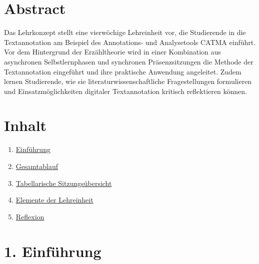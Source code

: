 \documentclass[
          a4paper,
        ]{article}
\providecommand{\tightlist}{%
  \setlength{\itemsep}{0pt}\setlength{\parskip}{0pt}}
\begin{document}
\pagestyle{plain}


\maketitle
















\pagestyle{page}

\renewcommand{\arraystretch}{3}  %

\section{Abstract}\label{abstract}

Das Lehrkonzept stellt eine vierwöchige Lehreinheit vor, die Studierende
in die Textannotation am Beispiel des Annotations- und Analysetools
CATMA einführt. Vor dem Hintergrund der Erzähltheorie wird in einer
Kombination aus asynchronen Selbstlernphasen und synchronen
Präsenzsitzungen die Methode der Textannotation eingeführt und ihre
praktische Anwendung angeleitet. Zudem lernen Studierende, wie sie
literaturwissenschaftliche Fragestellungen formulieren und
Einsatzmöglichkeiten digitaler Textannotation kritisch reflektieren
können.

\section{Inhalt}\label{inhalt}

\begin{enumerate}
\def\labelenumi{\arabic{enumi}.}
\tightlist
\item
  \hyperref[einfuxfchrung]{Einführung}
\item
  \hyperref[gesamtablauf]{Gesamtablauf}
\item
  \hyperref[tabellarische-sitzungsuxfcbersicht]{Tabellarische
  Sitzungsübersicht}
\item
  \hyperref[elemente-der-lehreinheit]{Elemente der Lehreinheit}
\item
  \hyperref[reflexion]{Reflexion}
\end{enumerate}

\section{1. Einführung}\label{einfuxfchrung}
\end{document}
